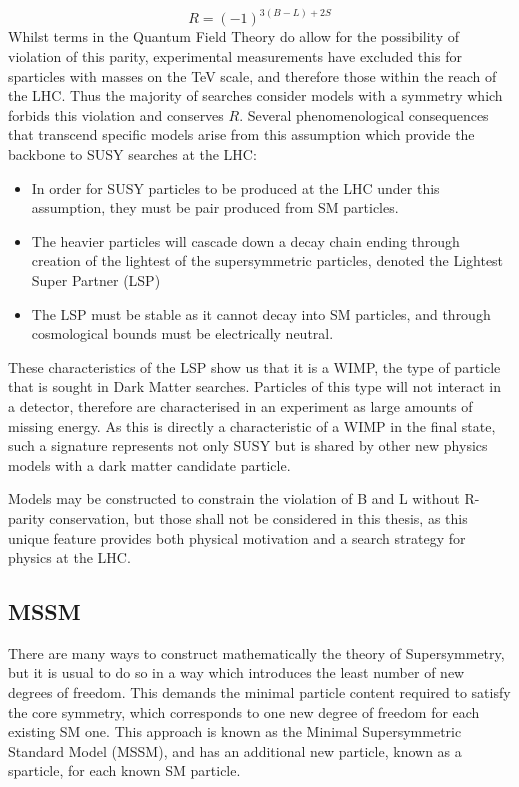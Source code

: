 \begin{equation}
R = (-1)^{3(B-L)+2S}
\label{eqn:RPAR}
\end{equation}
Whilst terms in the Quantum Field Theory do allow for the possibility of violation of this parity, experimental measurements have excluded this for sparticles with masses on the TeV scale, and therefore those within the reach of the LHC. Thus the  majority of searches consider models with a symmetry which forbids this violation and conserves $R$. Several phenomenological consequences that transcend specific models arise from this assumption which provide the backbone to SUSY searches at the LHC:

\begin{itemize}
\item{In order for SUSY particles to be produced at the LHC under this assumption, they must be pair produced from SM particles.} 

\item{The heavier particles will cascade down a decay chain ending through creation of the lightest of the supersymmetric particles, denoted the Lightest Super Partner (LSP)}

\item{The LSP must be stable as it cannot decay into SM particles, and through cosmological bounds must be electrically neutral.} 
\end{itemize}
These characteristics of the LSP show us that it is a WIMP, the type of particle that is sought in Dark Matter searches.  Particles of this type will not interact in a detector, therefore are characterised in an experiment as large amounts of missing energy. As this is directly a characteristic of a WIMP in the final state, such a signature represents not only SUSY but is shared by other new physics models with a dark matter candidate particle. 

Models may be constructed to constrain the violation of B and L without R-parity conservation, but those shall not be considered in this thesis, as this unique feature provides both physical motivation and a search strategy for physics at the LHC.


\subsection{MSSM} 

There are many ways to construct mathematically the theory of Supersymmetry, but it is usual to do so in a way which introduces the least number of new degrees of freedom. This demands the minimal particle content required to satisfy the core symmetry, which corresponds to one new degree of freedom for each existing SM one. This approach is known as the Minimal Supersymmetric Standard Model (MSSM), and has an additional new particle, known as a sparticle, for each known SM particle. 

